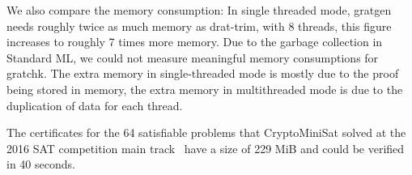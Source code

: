 \documentclass{llncs}
\begin{document}
  We also compare the memory consumption: In single threaded mode, gratgen needs roughly twice as much memory as drat-trim, with 8 threads, this figure increases to 
  roughly 7 times more memory. Due to the garbage collection in Standard ML, we could not measure meaningful memory consumptions for gratchk.
  The extra memory in single-threaded mode is mostly due to the proof being stored in memory, the extra memory in multithreaded mode is due to the duplication of data for each thread.
  
  The certificates for the 64 satisfiable problems that CryptoMiniSat solved at the 2016 SAT competition main track~\cite{satcomp-2016} have a size of 229 MiB and could be 
  verified in 40 seconds.

  
  
  
\end{document}
